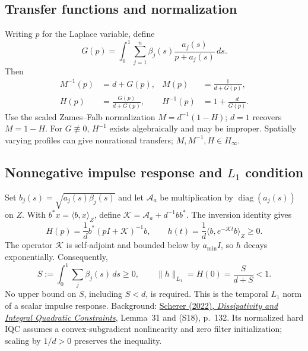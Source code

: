 ﻿\documentclass[11pt,a4paper]{article}
\begin{document}
\subsection*{Transfer functions and normalization}
Writing $p$ for the Laplace variable, define
\begin{equation*}
G(p)=\int_0^1\sum_{j=1}^n\beta_j(s)\frac{a_j(s)}{p+a_j(s)}\,ds.
\end{equation*}
Then
\begin{equation*}
\boxed{
\begin{aligned}
M^{-1}(p)&=d+G(p),& M(p)&=\frac{1}{d+G(p)},\\[0.4em]
H(p)&=\frac{G(p)}{d+G(p)},& H^{-1}(p)&=1+\frac{d}{G(p)}.
\end{aligned}}
\end{equation*}
Use the scaled Zames--Falb normalization $M=d^{-1}(1-H)$;
$d=1$ recovers $M=1-H$. For $G\not\equiv0$, $H^{-1}$ exists
algebraically and may be improper. Spatially varying profiles can give
nonrational transfers; $M,M^{-1},H\in H_\infty$.

\subsection*{Nonnegative impulse response and $L_1$ condition}
Set $b_j(s)=\sqrt{a_j(s)\beta_j(s)}$ and let $\mathcal A_a$ be
multiplication by $\operatorname{diag}(a_j(s))$ on $Z$.
With $b^*x=\langle b,x\rangle_Z$, define
$\mathcal K=\mathcal A_a+d^{-1}bb^*$.
The inversion identity gives
\begin{equation*}
H(p)=\frac1d b^*(pI+\mathcal K)^{-1}b,\qquad
h(t)=\frac1d\langle b,e^{-\mathcal Kt}b\rangle_Z\geq0.
\end{equation*}
The operator $\mathcal K$ is self-adjoint and bounded below by
$a_{\min}I$, so $h$ decays exponentially. Consequently,
\begin{equation*}
\boxed{S:=\int_0^1\sum_j\beta_j(s)\,ds\geq0,\qquad
\|h\|_{L_1}=H(0)=\frac{S}{d+S}<1.}
\end{equation*}
No upper bound on $S$, including $S<d$, is required. This is the
temporal $L_1$ norm of a scalar impulse response. Background:
\href{https://doi.org/10.1109/MCS.2022.3157117}{Scherer (2022),
\emph{Dissipativity and Integral Quadratic Constraints}}, Lemma~31
and (S18), p.~132. Its normalized hard IQC assumes a convex-subgradient
nonlinearity and zero filter initialization; scaling by $1/d>0$
preserves the inequality.
\end{document}
